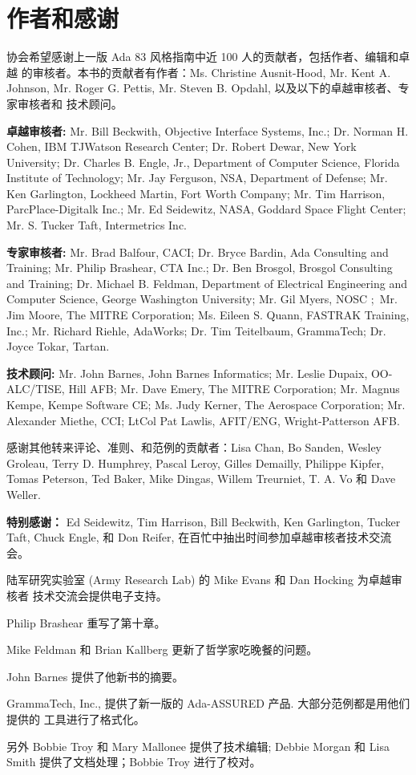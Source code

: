 \chapter{作者和感谢}
\pagestyle{empty}

协会希望感谢上一版 Ada 83 风格指南中近 100 人的贡献者，包括作者、编辑和卓越
的审核者。本书的贡献者有作者：Ms. Christine Ausnit-Hood, Mr. Kent A. Johnson,
Mr. Roger G. Pettis, Mr. Steven B. Opdahl, 以及以下的卓越审核者、专家审核者和
技术顾问。

\textbf{卓越审核者:} Mr. Bill Beckwith, Objective Interface Systems, Inc.;
Dr. Norman H. Cohen, IBM TJWatson Research Center; Dr. Robert Dewar,
New York University; Dr. Charles B. Engle, Jr., Department of Computer Science,
Florida Institute of Technology;
Mr. Jay Ferguson, NSA, Department of Defense;
Mr. Ken Garlington, Lockheed Martin, Fort Worth Company; Mr. Tim Harrison,
ParcPlace-Digitalk Inc.; Mr. Ed Seidewitz, NASA, Goddard Space Flight Center;
Mr. S. Tucker Taft, Intermetrics Inc.

\textbf{专家审核者:} Mr. Brad Balfour, CACI; Dr. Bryce Bardin,
Ada Consulting and Training; Mr. Philip Brashear, CTA Inc.; Dr. Ben Brosgol,
Brosgol Consulting and Training; Dr. Michael B. Feldman,
Department of Electrical Engineering and Computer Science,
George Washington University; Mr. Gil Myers, NOSC ;\
Mr. Jim Moore, The MITRE Corporation;
Ms. Eileen S. Quann, FASTRAK Training, Inc.; Mr. Richard Riehle, AdaWorks;
Dr. Tim Teitelbaum, GrammaTech; Dr. Joyce Tokar, Tartan.

\textbf{技术顾问:} Mr. John Barnes, John Barnes Informatics; Mr. Leslie Dupaix,
OO-ALC/TISE, Hill AFB; Mr. Dave Emery, The MITRE Corporation; Mr. Magnus Kempe,
Kempe Software CE; Ms. Judy Kerner, The Aerospace Corporation; Mr. Alexander
Miethe, CCI; LtCol Pat Lawlis, AFIT/ENG, Wright-Patterson AFB.

感谢其他转来评论、准则、和范例的贡献者：Lisa Chan, Bo Sanden, Wesley Groleau,
Terry D. Humphrey, Pascal Leroy, Gilles Demailly, Philippe Kipfer, Tomas
Peterson, Ted Baker, Mike Dingas, Willem Treurniet, T. A. Vo 和 Dave Weller.

\textbf{特别感谢：} 
Ed Seidewitz, Tim Harrison, Bill Beckwith, Ken Garlington, Tucker Taft,
Chuck Engle, 和 Don Reifer, 在百忙中抽出时间参加卓越审核者技术交流会。

陆军研究实验室 (Army Research Lab) 的 Mike Evans 和 Dan Hocking 为卓越审核者
技术交流会提供电子支持。

Philip Brashear 重写了第十章。

Mike Feldman 和 Brian Kallberg 更新了哲学家吃晚餐的问题。

John Barnes 提供了他新书的摘要。

GrammaTech, Inc., 提供了新一版的 Ada-ASSURED 产品. 大部分范例都是用他们提供的
工具进行了格式化。

另外 Bobbie Troy 和 Mary Mallonee 提供了技术编辑; Debbie Morgan 和 Lisa Smith
提供了文档处理；Bobbie Troy 进行了校对。

